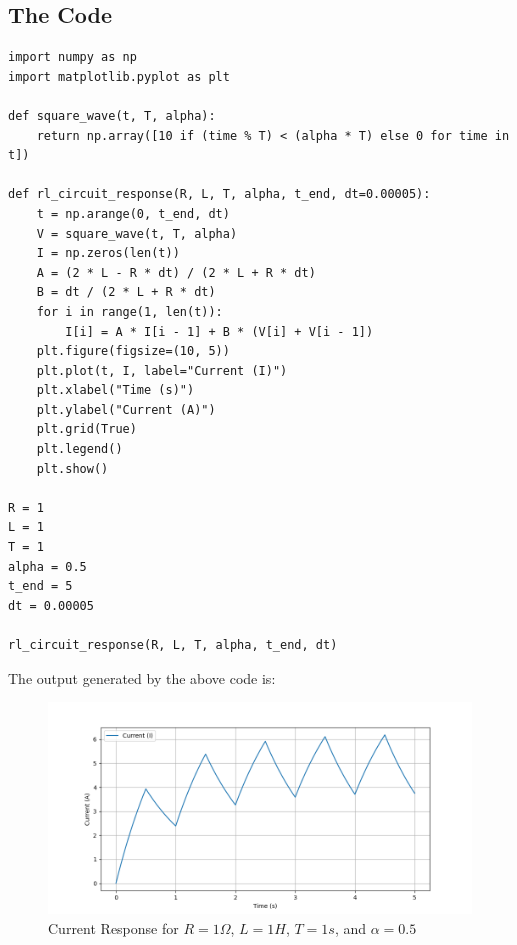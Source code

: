 \begin{multicols}{2}
\subsection{The Code}
\begin{lstlisting}[caption={Code for Numerical Analysis}]
import numpy as np
import matplotlib.pyplot as plt

def square_wave(t, T, alpha):
    return np.array([10 if (time % T) < (alpha * T) else 0 for time in t])

def rl_circuit_response(R, L, T, alpha, t_end, dt=0.00005):
    t = np.arange(0, t_end, dt)
    V = square_wave(t, T, alpha)
    I = np.zeros(len(t))
    A = (2 * L - R * dt) / (2 * L + R * dt)
    B = dt / (2 * L + R * dt)
    for i in range(1, len(t)):
        I[i] = A * I[i - 1] + B * (V[i] + V[i - 1])
    plt.figure(figsize=(10, 5))
    plt.plot(t, I, label="Current (I)")
    plt.xlabel("Time (s)")
    plt.ylabel("Current (A)")
    plt.grid(True)
    plt.legend()
    plt.show()

R = 1
L = 1
T = 1
alpha = 0.5
t_end = 5
dt = 0.00005

rl_circuit_response(R, L, T, alpha, t_end, dt)

\end{lstlisting}

The output generated by the above code is:
\begin{figure}[H]
  \centering
  \includegraphics[width=\columnwidth]{sections/4_og.png}
  \caption{Current Response for $R=1\Omega$, $L=1H$, $T=1s$, and $\alpha=0.5$}
\end{figure}

\end{multicols}
